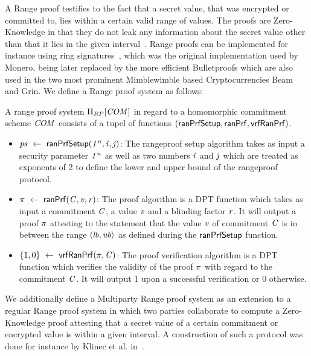 A Range proof testifies to the fact that a secret value, that was encrypted or committed to, lies within a certain valid range of values.
The proofs are Zero-Knowledge in that they do not leak any information about the secret value other than that it lies in the given interval~\cite{bunz2018bulletproofs}.
Range proofs can be implemented for instance using ring signatures~\cite{noether2016ring}, which was the original implementation used by Monero, being later replaced by the more efficient Bulletproofs\cite{bunz2018bulletproofs} which are also used in the two most prominent Mimblewimble based Cryptocurrencies Beam and Grin.
We define a Range proof system as follows:

\begin{definition}\label{def:pre:rangeproof}
    A range proof system $\Pi_{RP}[\mathit{COM}]$ in regard to a homomorphic commitment scheme $\mathit{COM}$ consists of a tupel of functions $(\mathsf{ranPrfSetup}, \mathsf{ranPrf}, \mathsf{vrfRanPrf})$.
    \begin{itemize}
        \item $\mathit{ps} ~\leftarrow~ \mathsf{ranPrfSetup}(\mathit{1^n},\mathit{i},\mathit{j})$: The rangeproof setup algorithm takes as input a security parameter $\mathit{1^n}$ as well as two numbers $\mathit{i}$ and $\mathit{j}$ which are treated as exponents of 2 to define the lower and upper bound of the rangeproof protocol.
        \item $\pi ~\leftarrow~ \mathsf{ranPrf}(\mathit{C},\mathit{v},\mathit{r})$: The proof algorithm is a DPT function which takes as input a commitment $\mathit{C}$, a value $\mathit{v}$ and a blinding factor $\mathit{r}$.
        It will output a proof $\pi$ attesting to the statement that the value $\mathit{v}$ of commitment $\mathit{C}$ is in between the range $\langle \mathit{lb}, \mathit{ub} \rangle$ as defined during the $\mathsf{ranPrfSetup}$ function.
        \item $\{1,0\} ~\leftarrow~ \mathsf{vrfRanPrf}(\pi,\mathit{C})$: The proof verification algorithm is a DPT function which verifies the validity of the proof $\pi$ with regard to the commitment $\mathit{C}$.
        It will output 1 upon a successful verification or 0 otherwise.
    \end{itemize}
\end{definition}

We additionally define a Multiparty Range proof system as an extension to a regular Range proof system in which two parties collaborate to compute a Zero-Knowledge proof attesting that a secret value of a certain commitment or encrypted value is within a given interval.
A construction of such a protocol was done for instance by Klinec et al. in~\cite{klinec2020privacy}.


